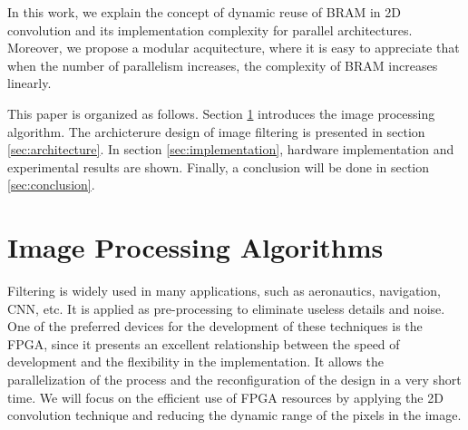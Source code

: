 \documentclass[conference,compsoc]{IEEEtran}
\begin{document}
In this work, we explain the concept of dynamic reuse of BRAM in 2D convolution
and its implementation complexity for parallel architectures. Moreover, we
propose a modular acquitecture, where it is easy to appreciate that when the
number of parallelism increases, the complexity of BRAM increases linearly.

This paper is organized as follows. Section \ref{sec:preproc} introduces the
image processing algorithm. The archicterure design of image filtering is
presented in section \ref{sec:architecture}. In section
\ref{sec:implementation}, hardware implementation and experimental results are
shown. Finally, a conclusion will be done in section \ref{sec:conclusion}.

%
%
%
%
%
% 

\section{Image Processing Algorithms}\label{sec:preproc}

Filtering is widely used in many applications, such as aeronautics, navigation,
CNN, etc. It is applied as pre-processing to eliminate useless details and
noise. One of the preferred devices for the development of these techniques is
the FPGA, since it presents an excellent relationship between the speed of
development and the flexibility in the implementation. It allows the
parallelization of the process and the reconfiguration of the design in a very
short time. We will focus on the efficient use of FPGA resources by applying the
2D convolution technique and reducing the dynamic range of the pixels in the
image.
\end{document}
